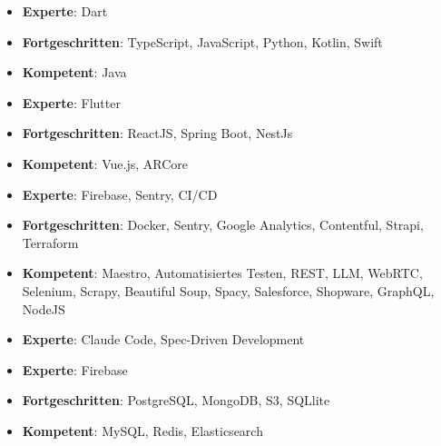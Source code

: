 






{
\quad
\begin{itemize}
\item  \textbf{Experte}: Dart
\item  \textbf{Fortgeschritten}: TypeScript, JavaScript, Python, Kotlin, Swift
\item  \textbf{Kompetent}: Java
\end{itemize}
}

\vspace{1em}

{
\quad
\begin{itemize}
\item  \textbf{Experte}: Flutter
\item  \textbf{Fortgeschritten}: ReactJS, Spring Boot, NestJs
\item  \textbf{Kompetent}: Vue.js, ARCore
\end{itemize}
}

\vspace{1em}

{
\quad
\begin{itemize}
\item  \textbf{Experte}: Firebase, Sentry, CI/CD
\item  \textbf{Fortgeschritten}: Docker, Sentry, Google Analytics, Contentful, Strapi, Terraform
\item  \textbf{Kompetent}: Maestro, Automatisiertes Testen, REST, LLM, WebRTC, Selenium, Scrapy, Beautiful Soup, Spacy, Salesforce, Shopware, GraphQL, NodeJS
\end{itemize}
}

\vspace{1em}

{
\quad
\begin{itemize}
\item  \textbf{Experte}: Claude Code, Spec-Driven Development
\end{itemize}
}

\vspace{1em}

{
\quad
\begin{itemize}
\item  \textbf{Experte}: Firebase
\item  \textbf{Fortgeschritten}: PostgreSQL, MongoDB, S3, SQLlite
\item  \textbf{Kompetent}: MySQL, Redis, Elasticsearch
\end{itemize}
}




